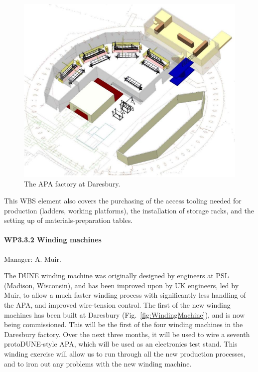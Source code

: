 \begin{figure}
    \centering
    \includegraphics{figs/WP3/FactoryLayout.png}
    \caption{The APA factory at Daresbury.}
    \label{fig:APAFactory}
\end{figure}

This WBS element also covers the purchasing of the access tooling needed for production (ladders, working platforms), the installation of storage racks, and the setting up of materials-preparation tables.


\paragraph{WP3.3.2 Winding machines} Manager: A. Muir.

The DUNE winding machine was originally designed by engineers at PSL (Madison, Wisconsin), and has been improved upon by UK engineers, led by Muir, to allow a much faster winding process with significantly less handling of the APA, and improved wire-tension control. The first of the new winding machines has been built at Daresbury (Fig.~\ref{fig:WindingMachine}), and is now being commissioned. This will be the first of the four winding machines in the Daresbury factory. Over the next three months, it will be used to wire a seventh protoDUNE-style APA, which will be used as an electronics test stand. This winding exercise will allow us to run through all the new production processes, and to iron out any problems with the new winding machine.

